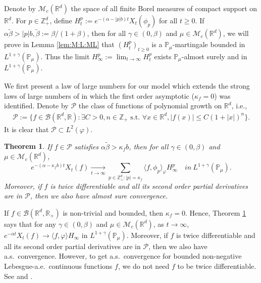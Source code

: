 \documentclass[12pt,a4paper]{amsart}
\theoremstyle{plain}
\newtheorem{thm}{Theorem}[section]
\theoremstyle{definition}
\numberwithin{equation}{section}
\begin{document}
Denote by $\mathcal M_c(\mathbb R^d)$ the space of all finite Borel measures of compact support on $\mathbb R^d$.
For $p\in \mathbb{Z}_+^d$, define
\(
  H_t^p
  := e^{-(\alpha-|p|b)t}X_t(\phi_p)
\)
for all $t\geq 0$.
If $\alpha \tilde \beta>|p|b, \tilde \beta := \beta/(1+\beta)$, then for all $\gamma\in (0, \beta)$ and $\mu\in \mathcal M_c(\mathbb R^d)$, we will prove in Lemma \ref{lem:M:L:ML} that $(H_t^p)_{t\geq 0}$ is a $\mathbb{P}_{\mu}$-martingale bounded in $L^{1+\gamma}(\mathbb{P}_{\mu})$.
Thus the limit $H^p_{\infty}:=\lim_{t\rightarrow \infty}H_t^p$ exists $\mathbb{P}_{\mu}$-almost surely and in $L^{1+\gamma}(\mathbb{P}_{\mu})$.

We first present a law of large numbers for our model which extends the strong laws of large numbers of \cite{ChenRenYang2019Skeleton, EckhoffKyprianouWinkel2015Spines} in which the first order asymptotic ($\kappa_f=0$) was identified.
Denote by $\mathcal P$ the class of functions of polynomial growth on $\mathbb R^d$, i.e.,
\begin{align}
  \label{eq: polynomial growth function}
  \mathcal{P}
  := \{f\in \mathcal B(\mathbb R^d, \mathbb R):\exists C>0, n \in \mathbb Z_+ \text{~s.t.~} \forall x\in \mathbb R^d, |f(x)|\leq C(1+|x|)^n \}.
\end{align}
It is clear that $\mathcal{P} \subset L^2(\varphi)$.
\begin{thm}
  \label{thm: law of large number}
  If $f \in \mathcal{P}$ satisfies $\alpha\tilde \beta>\kappa_f b$, then for all $\gamma\in (0, \beta)$ and  $\mu\in \mathcal M_c(\mathbb R^d)$,
  \[
    e^{-(\alpha-\kappa_fb)t}X_t(f)
    \xrightarrow[t\to \infty]{}\sum_{p\in \mathbb Z_+^d:|p|=\kappa_f}\langle f, \phi_p\rangle_{\varphi} H_{\infty}^p
    \quad in~ L^{1+\gamma}(\mathbb{P}_{\mu}).
  \]
  Moreover, if $f$ is twice differentiable and all its second order partial derivatives are in $\mathcal{P}$, then we also have almost sure convergence.
\end{thm}
If $f\in \mathcal B(\mathbb R^d, \mathbb R_+)$ is non-trivial and  bounded, then $\kappa_f=0$.
Hence, Theorem \ref{thm: law of large number} says that for any $\gamma\in (0, \beta)$ and  $\mu\in \mathcal M_c(\mathbb R^d)$, as $t\rightarrow \infty$,
\(
  e^{-\alpha t}X_t(f)
  \rightarrow \langle f, \varphi\rangle H_{\infty}
\)
in $L^{1+\gamma}(\mathbb{P}_{\mu})$.
Moreover, if $f$ is twice differentiable and all its second order partial derivatives are in $\mathcal{P}$, then we also have a.s.\ convergence.
However, to get a.s.\ convergence for bounded non-negative
Lebesgue-a.e.\ continuous functions $f$, we do not need $f$ to be twice differentiable.
See \cite[Theorem 2.13 \& Example 8.1]{ChenRenYang2019Skeleton} and \cite[Theorem 1.2 \& Example 4.1]{EckhoffKyprianouWinkel2015Spines}.
\end{document}
